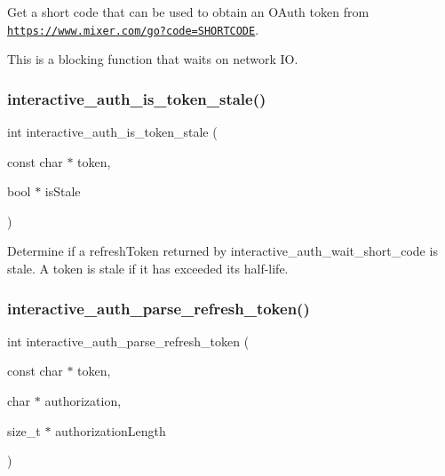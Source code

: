Get a short code that can be used to obtain an O\+Auth token from {\ttfamily \href{https://www.mixer.com/go?code=SHORTCODE}{\tt https\+://www.\+mixer.\+com/go?code=\+S\+H\+O\+R\+T\+C\+O\+DE}}. 

This is a blocking function that waits on network IO. \mbox{\label{group___interactivity_gadc0bce85838a4ef26479f05cee15ce3f}} 
\subsubsection{\texorpdfstring{interactive\+\_\+auth\+\_\+is\+\_\+token\+\_\+stale()}{interactive\_auth\_is\_token\_stale()}}
{\footnotesize\ttfamily int interactive\+\_\+auth\+\_\+is\+\_\+token\+\_\+stale (\begin{DoxyParamCaption}\item[{const char $\ast$}]{token,  }\item[{bool $\ast$}]{is\+Stale }\end{DoxyParamCaption})}



Determine if a {\ttfamily refresh\+Token} returned by {\ttfamily interactive\+\_\+auth\+\_\+wait\+\_\+short\+\_\+code} is stale. A token is stale if it has exceeded its half-\/life. 

\mbox{\label{group___interactivity_gaebcb6d12678db4826f74b36bf3cb9763}} 
\subsubsection{\texorpdfstring{interactive\+\_\+auth\+\_\+parse\+\_\+refresh\+\_\+token()}{interactive\_auth\_parse\_refresh\_token()}}
{\footnotesize\ttfamily int interactive\+\_\+auth\+\_\+parse\+\_\+refresh\+\_\+token (\begin{DoxyParamCaption}\item[{const char $\ast$}]{token,  }\item[{char $\ast$}]{authorization,  }\item[{size\+\_\+t $\ast$}]{authorization\+Length }\end{DoxyParamCaption})}



